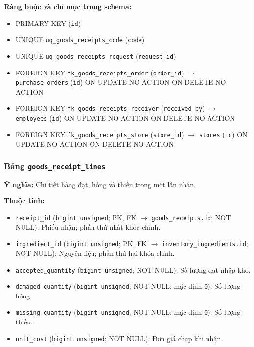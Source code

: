\textbf{Ràng buộc và chỉ mục trong schema:}

\begin{itemize}

\item PRIMARY KEY (\texttt{id})

\item UNIQUE \texttt{uq\_goods\_receipts\_code} (\texttt{code})

\item UNIQUE \texttt{uq\_goods\_receipts\_request} (\texttt{request\_id})

\item FOREIGN KEY \texttt{fk\_goods\_receipts\_order} (\texttt{order\_id}) $\rightarrow$ \texttt{purchase\_orders} (\texttt{id}) ON UPDATE NO ACTION ON DELETE NO ACTION

\item FOREIGN KEY \texttt{fk\_goods\_receipts\_receiver} (\texttt{received\_by}) $\rightarrow$ \texttt{employees} (\texttt{id}) ON UPDATE NO ACTION ON DELETE NO ACTION

\item FOREIGN KEY \texttt{fk\_goods\_receipts\_store} (\texttt{store\_id}) $\rightarrow$ \texttt{stores} (\texttt{id}) ON UPDATE NO ACTION ON DELETE NO ACTION

\end{itemize}

\subsubsection{Bảng \texttt{goods\_receipt\_lines}}

\textbf{Ý nghĩa:} Chi tiết hàng đạt, hỏng và thiếu trong một lần nhận.\par

\textbf{Thuộc tính:}

\begin{itemize}

\item \texttt{receipt\_id} (\texttt{bigint unsigned}; PK, FK $\rightarrow$ \texttt{goods\_receipts.id}; NOT NULL): Phiếu nhận; phần thứ nhất khóa chính.

\item \texttt{ingredient\_id} (\texttt{bigint unsigned}; PK, FK $\rightarrow$ \texttt{inventory\_ingredients.id}; NOT NULL): Nguyên liệu; phần thứ hai khóa chính.

\item \texttt{accepted\_quantity} (\texttt{bigint unsigned}; NOT NULL): Số lượng đạt nhập kho.

\item \texttt{damaged\_quantity} (\texttt{bigint unsigned}; NOT NULL; mặc định \texttt{0}): Số lượng hỏng.

\item \texttt{missing\_quantity} (\texttt{bigint unsigned}; NOT NULL; mặc định \texttt{0}): Số lượng thiếu.

\item \texttt{unit\_cost} (\texttt{bigint unsigned}; NOT NULL): Đơn giá chụp khi nhận.

\end{itemize}

